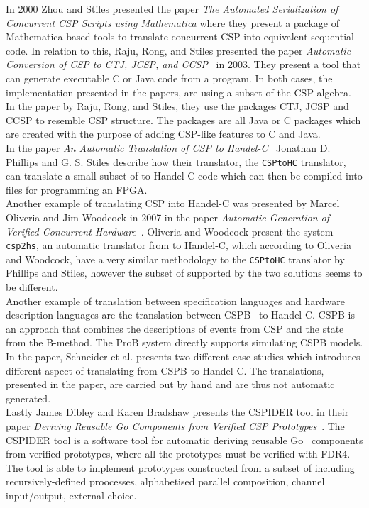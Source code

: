 In 2000 Zhou and Stiles presented the paper \textit{The Automated Serialization of Concurrent CSP Scripts using Mathematica}\cite{Zhou2000} where they present a package of Mathematica based tools to translate concurrent CSP into equivalent sequential code. In relation to this, Raju,
Rong, and Stiles presented the paper \textit{Automatic Conversion of CSP to CTJ, JCSP, and CCSP}~\cite{Raju2003} in 2003. They present a tool that can generate executable C or Java code from a \cspm{} program. In both cases, the implementation presented in the papers, are using a subset of the CSP algebra. In the paper by Raju,
Rong, and Stiles, they use the packages CTJ, JCSP and CCSP to resemble CSP structure. The packages are all Java or C packages which are created with the purpose of adding CSP-like features to C and Java.\\
In the paper \textit{An Automatic Translation of CSP to Handel-C}~\cite{Phillips2004} Jonathan D. Phillips and G. S. Stiles describe how their translator, the \texttt{CSPtoHC} translator, can translate a small subset of \cspm{} to Handel-C\cite{Celoxia2002} code which can then be compiled into files for programming an FPGA. \\
Another example of translating CSP into Handel-C was presented by Marcel Oliveria and Jim Woodcock in 2007 in the paper \textit{Automatic Generation of Verified Concurrent
Hardware}~\cite{Oliveira2007}. Oliveria and Woodcock present the system \texttt{csp2hs}, an automatic translator from \cspm{} to Handel-C, which according to Oliveria and Woodcock, have a very similar methodology to the \texttt{CSPtoHC} translator by Phillips and Stiles, however the subset of \cspm{} supported by the two solutions seems to be different.\\
Another example of translation between specification languages and hardware description languages are the translation between CSP\textbar\textbar B~\cite{Schneider2002a} to Handel-C. CSP\textbar\textbar B is an approach that combines the descriptions of events from CSP and the state from the B-method. The ProB system\cite{ProB}\cite{Leuschel2003} directly supports simulating CSP\textbar\textbar B models. In the paper,  Schneider et al. presents two different case studies which introduces different aspect of translating from CSP\textbar\textbar B to Handel-C. The translations, presented in the paper, are carried out by hand and are thus not automatic generated.\\
Lastly James Dibley and Karen Bradshaw presents the CSPIDER tool in their paper \textit{Deriving Reusable Go Components from Verified CSP Prototypes}~\cite{Dibley2018}. The CSPIDER tool is a software tool for automatic deriving reusable Go~\cite{Go} components from verified \cspm{} prototypes, where all the \cspm{} prototypes must be verified with FDR4. The tool is able to implement prototypes constructed from a subset of \cspm{} including recursively-defined proocesses, alphabetised parallel composition, channel input/output, external choice.